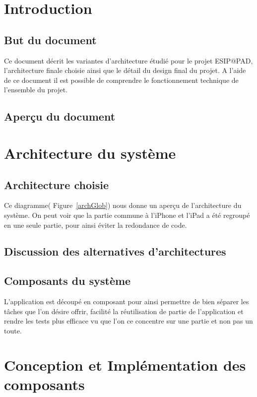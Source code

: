 \section{Introduction}
	\subsection{But du document}
		Ce document décrit les variantes d'architecture étudié pour le projet ESIP@PAD, l'architecture finale choisie ainsi que le détail du design final du projet. A l'aide de ce document il est possible de comprendre le fonctionnement technique de l'ensemble du projet.
	\subsection{Aperçu du document}
\section{Architecture du système }
	\subsection{Architecture choisie}	
		 Ce diagramme( Figure~\ref{archGlob}) nous donne un aperçu de l'architecture du système. On peut voir que la partie commune à l'iPhone et l'iPad a été regroupé en une seule partie, pour ainsi éviter la redondance de code.
		\subsection{Discussion des alternatives d'architectures}
	\subsection{Composants du système}
		L'application est découpé en composant pour ainsi permettre de bien séparer les tâches que l'on désire offrir, facilité la réutilisation de partie de l'application et rendre les tests plus efficace vu que l'on ce concentre sur une partie et non pas un toute.
		

\section{Conception et Implémentation des composants}
